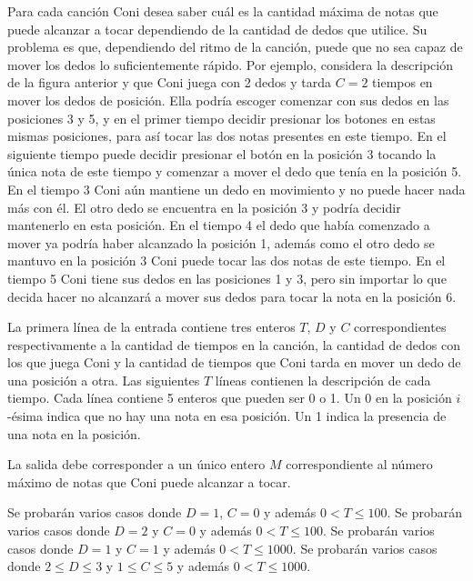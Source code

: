 \documentclass{oci}
\begin{document}
\begin{problemDescription}
  Para cada canción Coni desea saber cuál es la cantidad máxima de notas que
  puede alcanzar a tocar dependiendo de la cantidad de dedos que utilice.
  Su problema es que, dependiendo del ritmo de la canción, puede que no sea
  capaz de mover los dedos lo suficientemente rápido.
  Por ejemplo, considera la descripción de la figura anterior y que Coni juega
  con 2 dedos y tarda $C=2$ tiempos en mover los dedos de posición.
  Ella podría escoger comenzar con sus dedos en las posiciones 3 y 5, y en el
  primer tiempo decidir presionar los botones en estas mismas posiciones, para así
  tocar las dos notas presentes en este tiempo.
  En el siguiente tiempo puede decidir presionar el botón en la posición 3
  tocando la única nota de este tiempo y comenzar a mover el dedo que
  tenía en la posición 5.
  En el tiempo 3 Coni aún mantiene un dedo en movimiento y no puede hacer nada
  más con él.
  El otro dedo se encuentra en la posición 3 y podría decidir mantenerlo en esta
  posición.
  En el tiempo 4 el dedo que había comenzado a mover ya podría haber alcanzado
  la posición 1, además como el otro dedo se mantuvo en la posición 3 Coni puede
  tocar las dos notas de este tiempo.
  En el tiempo 5 Coni tiene sus dedos en las posiciones 1 y 3, pero sin importar
  lo que decida hacer no alcanzará a mover sus dedos para tocar la nota en la
  posición 6.
\end{problemDescription}
\begin{inputDescription}
  La primera línea de la entrada contiene tres enteros $T$, $D$ y $C$
  correspondientes respectivamente a la cantidad de tiempos en la canción, la
  cantidad de dedos con los que juega Coni y la cantidad de tiempos que Coni
  tarda en mover un dedo de una posición a otra.
  Las siguientes $T$ líneas contienen la descripción de cada tiempo.
  Cada línea contiene 5 enteros que pueden ser 0 o 1.
  Un 0 en la posición $i$-ésima indica que no hay una nota en esa posición.
  Un 1 indica la presencia de una nota en la posición.
\end{inputDescription}

\begin{outputDescription}
  La salida debe corresponder a un único entero $M$ correspondiente al número
  máximo de notas que Coni puede alcanzar a tocar.
\end{outputDescription}

\begin{scoreDescription}
   Se probarán varios casos donde $D = 1$, $C = 0$ y además $0 < T \le 100$.
   Se probarán varios casos donde $D = 2$ y $C = 0$ y además $0 < T \le 100$.
   Se probarán varios casos donde $D = 1$ y $C = 1$ y además $0 < T \le 1000$.
   Se probarán varios casos donde $2 \le D \le 3$ y $1 \le C \le 5$ y
  además $0 < T \le 1000$.
\end{scoreDescription}

\begin{sampleDescription}
\end{sampleDescription}
\end{document}
